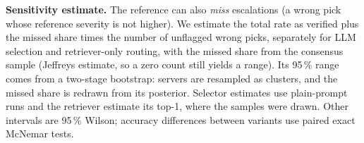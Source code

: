 \textbf{Sensitivity estimate.} The reference can also \emph{miss} escalations (a wrong pick whose
reference severity is not higher). We estimate the total rate as verified \seer plus the missed share
times the number of unflagged wrong picks, separately for LLM selection and retriever-only routing,
with the missed share from the consensus sample (Jeffreys estimate, so a zero count still yields a
range). Its 95\,\% range comes from a two-stage bootstrap: servers are resampled as clusters, and the
missed share is redrawn from its posterior. Selector estimates use plain-prompt runs and the retriever estimate its top-1, where the
samples were drawn. Other intervals are 95\,\% Wilson; accuracy differences between variants use paired exact
McNemar tests.
